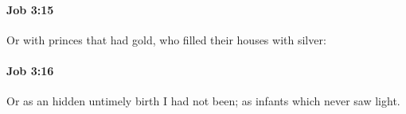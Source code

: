		\paragraph{Job 3:15} %
			\label{JOB-3-15}

			Or with princes that had gold, who filled their houses with silver:


		\paragraph{Job 3:16} %
			\label{JOB-3-16}

			Or as an hidden untimely birth I had not been; as infants which never saw light.


